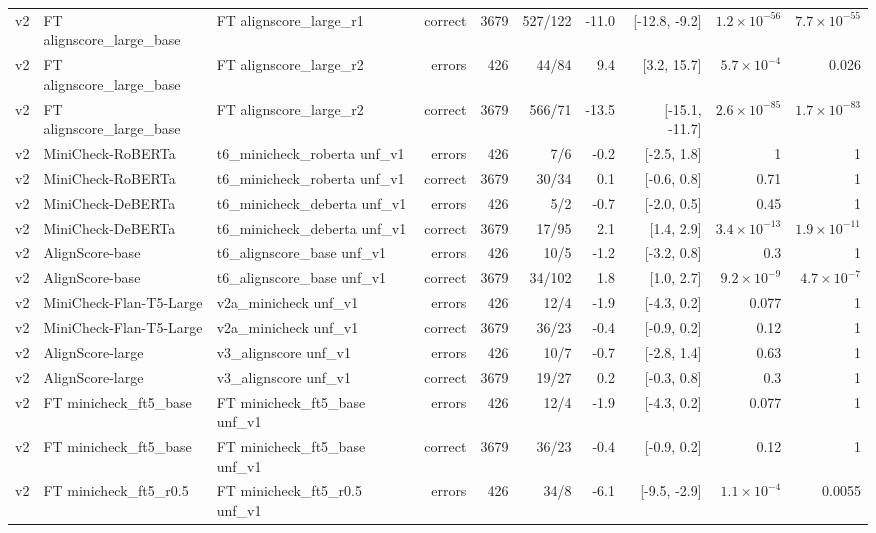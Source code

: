 \begin{scriptsize}
\begin{longtable}{lllrrrrrrr}
v2 & FT alignscore\_large\_base & FT alignscore\_large\_r1 & correct & 3679 & 527/122 & -11.0 & [-12.8, -9.2] & $1.2\times10^{-56}$ & $7.7\times10^{-55}$ \\
v2 & FT alignscore\_large\_base & FT alignscore\_large\_r2 & errors & 426 & 44/84 & 9.4 & [3.2, 15.7] & $5.7\times10^{-4}$ & 0.026 \\
v2 & FT alignscore\_large\_base & FT alignscore\_large\_r2 & correct & 3679 & 566/71 & -13.5 & [-15.1, -11.7] & $2.6\times10^{-85}$ & $1.7\times10^{-83}$ \\
v2 & MiniCheck-RoBERTa & t6\_minicheck\_roberta unf\_v1 & errors & 426 & 7/6 & -0.2 & [-2.5, 1.8] & 1 & 1 \\
v2 & MiniCheck-RoBERTa & t6\_minicheck\_roberta unf\_v1 & correct & 3679 & 30/34 & 0.1 & [-0.6, 0.8] & 0.71 & 1 \\
v2 & MiniCheck-DeBERTa & t6\_minicheck\_deberta unf\_v1 & errors & 426 & 5/2 & -0.7 & [-2.0, 0.5] & 0.45 & 1 \\
v2 & MiniCheck-DeBERTa & t6\_minicheck\_deberta unf\_v1 & correct & 3679 & 17/95 & 2.1 & [1.4, 2.9] & $3.4\times10^{-13}$ & $1.9\times10^{-11}$ \\
v2 & AlignScore-base & t6\_alignscore\_base unf\_v1 & errors & 426 & 10/5 & -1.2 & [-3.2, 0.8] & 0.3 & 1 \\
v2 & AlignScore-base & t6\_alignscore\_base unf\_v1 & correct & 3679 & 34/102 & 1.8 & [1.0, 2.7] & $9.2\times10^{-9}$ & $4.7\times10^{-7}$ \\
v2 & MiniCheck-Flan-T5-Large & v2a\_minicheck unf\_v1 & errors & 426 & 12/4 & -1.9 & [-4.3, 0.2] & 0.077 & 1 \\
v2 & MiniCheck-Flan-T5-Large & v2a\_minicheck unf\_v1 & correct & 3679 & 36/23 & -0.4 & [-0.9, 0.2] & 0.12 & 1 \\
v2 & AlignScore-large & v3\_alignscore unf\_v1 & errors & 426 & 10/7 & -0.7 & [-2.8, 1.4] & 0.63 & 1 \\
v2 & AlignScore-large & v3\_alignscore unf\_v1 & correct & 3679 & 19/27 & 0.2 & [-0.3, 0.8] & 0.3 & 1 \\
v2 & FT minicheck\_ft5\_base & FT minicheck\_ft5\_base unf\_v1 & errors & 426 & 12/4 & -1.9 & [-4.3, 0.2] & 0.077 & 1 \\
v2 & FT minicheck\_ft5\_base & FT minicheck\_ft5\_base unf\_v1 & correct & 3679 & 36/23 & -0.4 & [-0.9, 0.2] & 0.12 & 1 \\
v2 & FT minicheck\_ft5\_r0.5 & FT minicheck\_ft5\_r0.5 unf\_v1 & errors & 426 & 34/8 & -6.1 & [-9.5, -2.9] & $1.1\times10^{-4}$ & 0.0055 \\

\end{longtable}
\end{scriptsize}
